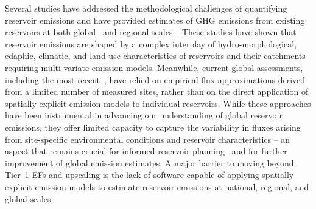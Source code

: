 \documentclass[review, authoryear, 1p]{elsarticle} %
\begin{document}

Several studies have addressed the methodological challenges of quantifying reservoir emissions and have provided estimates of \ac{GHG} emissions from existing reservoirs at both global~\citep{Barros2011, Soued2022, Deemer2016, Prairie2018, Harrison2021} and regional scales~\citep{Hidrovo2017, Rasanen2018, Almeida2019, Hansen2022}. 
These studies have shown that reservoir emissions are shaped by a complex interplay of hydro-morphological, edaphic, climatic, and land-use characteristics of reservoirs and their catchments~\citep{Deemer2016, Prairie2021} requiring multi-variate emission models.
Meanwhile, current global assessments, including the most recent~\citep{Harrison2021, Soued2022}, have relied on empirical flux approximations derived from a limited number of measured sites, rather than on the direct application of spatially explicit emission models to individual reservoirs.
While these approaches have been instrumental in advancing our understanding of global reservoir emissions, they offer limited capacity to capture the variability in fluxes arising from site-specific environmental conditions and reservoir characteristics -- an aspect that remains crucial for informed reservoir planning~\citep{janus2025planning} and for further improvement of global emission estimates.
A major barrier to moving beyond Tier~1 \acfp{EF} and upscaling is the lack of software capable of applying spatially explicit emission models to estimate reservoir emissions at national, regional, and global scales.
\end{document}
